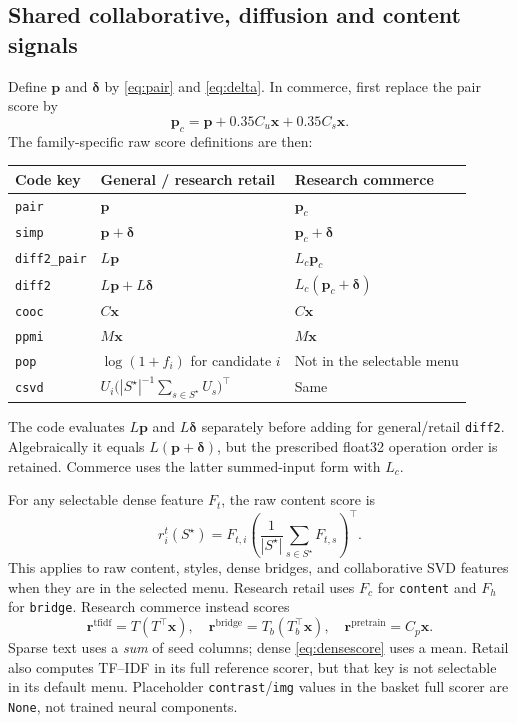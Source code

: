 \documentclass[11pt,a4paper]{article}
\newcommand{\code}[1]{\nolinkurl{#1}}
\newcommand{\sig}[1]{\mathrm{#1}}
\numberwithin{equation}{section}
\begin{document}
\subsection{Shared collaborative, diffusion and content signals}
Define $\bm p$ and $\bm\delta$ by \eqref{eq:pair} and \eqref{eq:delta}. In commerce,
first replace the pair score by
\begin{equation}
 \bm p_c=\bm p+0.35C_u\bm x+0.35C_s\bm x.
\end{equation}
The family-specific raw score definitions are then:
\begin{center}\small
\begin{tabularx}{\linewidth}{@{}p{.20\linewidth}YY@{}}
\toprule Code key & General / research retail & Research commerce \\\midrule
\code{pair} & $\bm p$ & $\bm p_c$ \\
\code{simp} & $\bm p+\bm\delta$ & $\bm p_c+\bm\delta$ \\
\code{diff2_pair} & $L\bm p$ & $L_c\bm p_c$ \\
\code{diff2} & $L\bm p+L\bm\delta$ & $L_c(\bm p_c+\bm\delta)$ \\
\code{cooc} & $C\bm x$ & $C\bm x$ \\
\code{ppmi} & $M\bm x$ & $M\bm x$ \\
\code{pop} & $\log(1+f_i)$ for candidate $i$ & Not in the selectable menu \\
\code{csvd} & $U_i\bigl(|S^\star|^{-1}\sum_{s\in S^\star}U_s\bigr)^\top$ & Same \\
\bottomrule
\end{tabularx}
\end{center}
The code evaluates $L\bm p$ and $L\bm\delta$ separately before adding for general/retail
\code{diff2}. Algebraically it equals $L(\bm p+\bm\delta)$, but the prescribed float32
operation order is retained. Commerce uses the latter summed-input form with $L_c$.

For any selectable dense feature $F_t$, the raw content score is
\begin{equation}\label{eq:densescore}
 r^t_i(S^\star)=F_{t,i}\left(\frac{1}{|S^\star|}\sum_{s\in S^\star}F_{t,s}\right)^\top.
\end{equation}
This applies to raw content, styles, dense bridges, and collaborative SVD features when
they are in the selected menu. Research retail uses $F_c$ for \code{content} and $F_h$
for \code{bridge}. Research commerce instead scores
\begin{equation}
 \bm r^{\sig{tfidf}}=T(T^\top\bm x),\quad
 \bm r^{\sig{bridge}}=T_b(T_b^\top\bm x),\quad
 \bm r^{\sig{pretrain}}=C_p\bm x.
\end{equation}
Sparse text uses a \emph{sum} of seed columns; dense \eqref{eq:densescore} uses a mean.
Retail also computes TF--IDF in its full reference scorer, but that key is not selectable
in its default menu. Placeholder \code{contrast}/\code{img} values in the basket full
scorer are \code{None}, not trained neural components.
\end{document}
